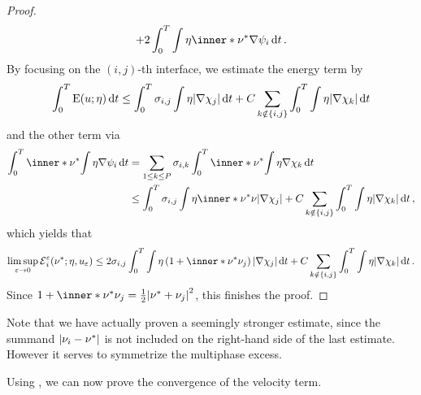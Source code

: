 \begin{proof}
\begin{equation*}
		+
		2 \int_{ 0 }^{ T }
			\int
				\eta
				\inner*{ \nu^{ \ast } }{ \nabla \psi_{ i } }
		\dd{ t }.
	\end{equation*}
	By focusing on the $ ( i, j )$-th interface, we estimate the energy term by
	\begin{equation*}
		\int_{ 0 }^{ T }
			\operatorname{E} ( u ; \eta )
		\dd{ t }
		\leq
		\int_{ 0 }^{ T }
			\sigma_{ i , j }
			\int
				\eta
			\abs{ \nabla \chi_{ j } }
		\dd{ t }
		+
		C \sum_{ k \notin \{ i , j \} }
			\int_{ 0 }^{ T }
				\int
					\eta
				\abs{ \nabla \chi_{ k } }
			\dd{ t }
	\end{equation*}
	and the other term via
	\begin{align*}
		\int_{ 0 }^{ T }
			\inner*{ \nu^{ \ast } }
			{
				\int
					\eta
				\nabla \psi_{ i }
			}
		\dd{ t }
		& =
		\sum_{ 1 \leq k \leq P }
			\sigma_{ i , k }
			\int_{ 0 }^{ T }
				\inner*{ \nu^{ \ast } }
				{
					\int
						\eta 
					\nabla \chi_{ k }
				}
			\dd{ t }
		\\
		& \leq
		\int_{ 0 }^{ T }
			\sigma_{ i , j }
			\int
				\eta
				\inner*{ \nu^{ \ast } }{ \nu }
			\abs{ \nabla \chi_{ j } }
		+
		C \sum_{ k \notin \{ i , j \} }
			\int_{ 0 }^{ T }
				\int
					\eta
				\abs{ \nabla \chi_{ k } }
			\dd{ t },
	\end{align*}
	which yields that
	\begin{equation*}
		\limsup_{ \varepsilon \to 0 }
			\tilt_excess_{ i }^{ \varepsilon } ( \nu^{ \ast } ; \eta , u_{ 
			\varepsilon } )
		\leq
		2 \sigma_{ i , j } \int_{ 0 }^{ T }
			\int
				\eta
				\left( 1 + \inner*{ \nu^{ \ast } }{ \nu_{ j } } \right)
			\abs{ \nabla \chi_{ j } }
		\dd{ t }
		+
		C \sum_{ k \notin \{ i , j \} }
			\int_{ 0 }^{ T }
				\int
					\eta 
				\abs{ \nabla \chi_{ k } }
			\dd{ t }.
	\end{equation*}
	Since $ 1 + \inner*{ \nu^{ \ast } }{ \nu_{ j } } = \frac{ 1 }{ 2 } \abs{ 
	\nu^{ \ast } + \nu_{ j } }^{ 2 } $, this finishes the proof.
\end{proof}

Note that we have actually proven a seemingly stronger estimate, since the 
summand $ \abs{ \nu_{ i } - \nu^{ \ast } } $ is not included on the right-hand 
side of the last estimate. However it serves to symmetrize the multiphase 
excess.

Using , we can 
now prove the convergence of the velocity term.

